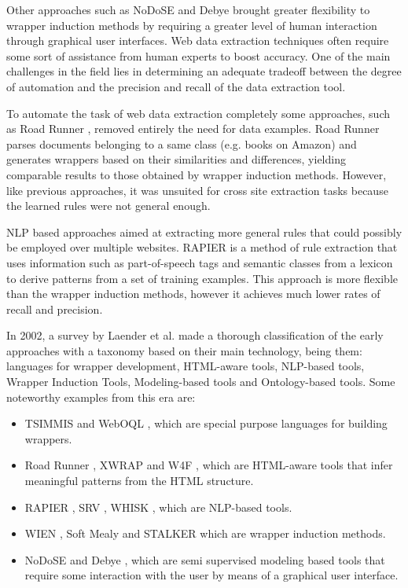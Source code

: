 \documentclass{nle}
\begin{document}
Other approaches such as NoDoSE \cite{Adelberg1998} and Debye \cite{Laender2002a} 
brought greater flexibility to wrapper induction methods by requiring a greater level 
of human interaction through graphical user interfaces. Web data extraction techniques often 
require some sort of assistance from human experts to boost accuracy. One of the main challenges 
in the field lies in determining an adequate tradeoff between the degree of automation and 
the precision and recall of the data extraction tool.

To automate the task of web data extraction completely some approaches,
such as Road Runner \cite{Crescenzi2001}, removed entirely the need for data examples.
Road Runner parses documents belonging to a same class (e.g. books on Amazon) and 
generates wrappers based on their similarities and differences, yielding comparable results 
to those obtained by wrapper induction methods. However, like previous approaches, it was 
unsuited for cross site extraction tasks because the learned rules were not general enough.

NLP based approaches aimed at extracting more general rules that could possibly
be employed over multiple websites. RAPIER \cite{Califf1999} is a method of rule
extraction that uses information such as part-of-speech tags and semantic classes from
a lexicon to derive patterns from a set of training examples. This approach is more
flexible than the wrapper induction methods, however it achieves much lower rates of 
recall and precision.

In 2002, a survey by Laender et al. \cite{Laender2002} made a thorough classification of the
early approaches with a taxonomy based on their main technology, being them: languages for
wrapper development, HTML-aware tools, NLP-based tools, Wrapper Induction Tools,
Modeling-based tools and Ontology-based tools. Some noteworthy examples from this era
are: 

\begin{itemize}
\item TSIMMIS \cite{Hammer1997} and WebOQL \cite{Arocena1999}, which are special purpose 
languages for building wrappers.

\item Road Runner \cite{Crescenzi2001}, XWRAP \cite{Liu2000} and W4F \cite{Sahuguet1999}, 
which are HTML-aware tools that infer meaningful patterns from the HTML structure.

\item RAPIER \cite{Califf1999}, SRV \cite{Freitag1998}, WHISK \cite{Soderland1999}, which 
are NLP-based tools.

\item WIEN \cite{Kushmerick2000}, Soft Mealy \cite{Hsu1998} and STALKER \cite{Muslea1999} which 
are wrapper induction methods.

\item NoDoSE \cite{Adelberg1998} and Debye \cite{Laender2002a}, which are semi supervised modeling
based tools that require some interaction with the user by means of a graphical
user interface.
\end{itemize}
\end{document}
